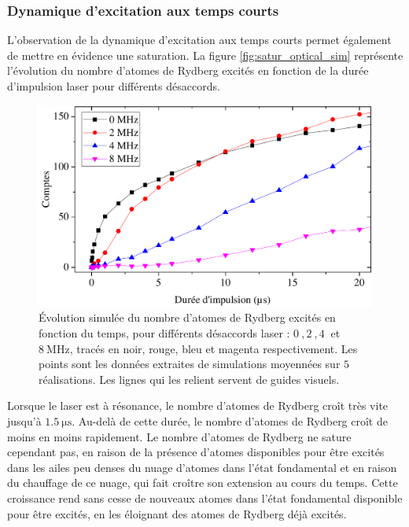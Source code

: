 \subsubsection*{Dynamique d'excitation aux temps courts}
\noindent L'observation de la dynamique d'excitation aux temps courts permet également de mettre en évidence une saturation.
La figure \eqref{fig:satur_optical_sim} représente l'évolution du nombre  d'atomes de Rydberg excités en fonction de la durée d'impulsion laser pour différents désaccords.%
%
\begin{figure}[h]
\centering
\includegraphics[width=\linewidth]{figures/low_l/satur_optical_sim}
\caption[\'Evolution simulée du nombre d'atomes de Rydberg excités en fonction du temps pour différents désaccords laser]{
\'Evolution simulée du nombre d'atomes de Rydberg excités en fonction du temps, pour différents désaccords laser : $\SI{0}{},\SI{2}{},\SI{4}{}$ et $\SI{8}{\MHz}$, tracés en noir, rouge, bleu et magenta respectivement.
Les points sont les données extraites de simulations moyennées sur $\SI{5}{}$ réalisations. Les lignes qui les relient servent de guides visuels.
}
\label{fig:satur_optical_sim}
\end{figure}
%

Lorsque le laser est à résonance, le nombre d'atomes de Rydberg croît très vite jusqu'à $\SI{1.5}{\us}$.
Au-delà de cette durée, le nombre d'atomes de Rydberg croît de moins en moins rapidement.
Le nombre d'atomes de Rydberg ne sature cependant pas, en raison de la présence d'atomes disponibles pour être excités dans les ailes peu denses du nuage d'atomes dans l'état fondamental et en raison du chauffage de ce nuage, qui fait croître son extension au cours du temps.
Cette croissance rend sans cesse de nouveaux atomes dans l'état fondamental disponible pour être excités, en les éloignant des atomes de Rydberg déjà excités.

